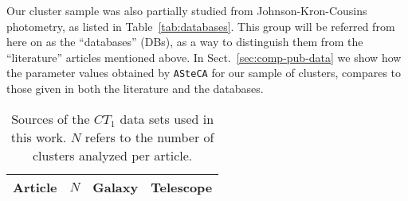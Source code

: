\documentclass{aa}
\begin{document}
Our cluster sample was also partially studied from Johnson-Kron-Cousins
photometry, as listed in Table~\ref{tab:databases}.
This group will be referred from here on as the ``databases'' (DBs), as a way to
distinguish them from the ``literature'' articles mentioned above.
%
In Sect.~\ref{sec:comp-pub-data} we show how the parameter values obtained
by \texttt{ASteCA} for our sample of clusters, compares to those given in both the
literature and the databases.

\begin{table} 
\centering
 \caption{Sources of the $CT_1$ data sets used in this work. $N$ refers to the
 number of clusters analyzed per article.}
\label{tab:literature}
 \begin{tabular}{l c c c}
\hline\hline
Article & $N$ & Galaxy & Telescope \\
\hline

\end{tabular}
\end{table}
\end{document}
